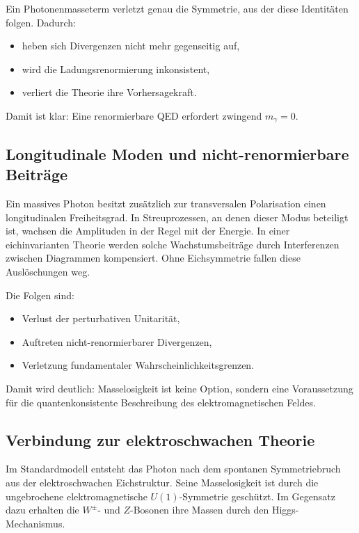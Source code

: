 Ein Photonenmasseterm verletzt genau die Symmetrie, aus der diese Identitäten 
folgen. Dadurch:

\begin{itemize}
	\item heben sich Divergenzen nicht mehr gegenseitig auf,
	\item wird die Ladungsrenormierung inkonsistent,
	\item verliert die Theorie ihre Vorhersagekraft.
\end{itemize}

Damit ist klar: Eine renormierbare QED erfordert zwingend $m_\gamma = 0$.

\subsection*{Longitudinale Moden und nicht-renormierbare Beiträge}

Ein massives Photon besitzt zusätzlich zur transversalen Polarisation einen 
longitudinalen Freiheitsgrad. In Streuprozessen, an denen dieser Modus 
beteiligt ist, wachsen die Amplituden in der Regel mit der Energie.  
In einer eichinvarianten Theorie werden solche Wachstumsbeiträge durch 
Interferenzen zwischen Diagrammen kompensiert. Ohne Eichsymmetrie fallen 
diese Auslöschungen weg.

Die Folgen sind:

\begin{itemize}
	\item Verlust der perturbativen Unitarität,
	\item Auftreten nicht-renormierbarer Divergenzen,
	\item Verletzung fundamentaler Wahrscheinlichkeitsgrenzen.
\end{itemize}

Damit wird deutlich: Masselosigkeit ist keine Option, sondern eine 
Voraussetzung für die quantenkonsistente Beschreibung des 
elektromagnetischen Feldes.

\subsection*{Verbindung zur elektroschwachen Theorie}

Im Standardmodell entsteht das Photon nach dem spontanen Symmetriebruch aus 
der elektroschwachen Eichstruktur. Seine Masselosigkeit ist durch die 
ungebrochene elektromagnetische $U(1)$-Symmetrie geschützt.  
Im Gegensatz dazu erhalten die $W^\pm$- und $Z$-Bosonen ihre Massen durch 
den Higgs-Mechanismus.

